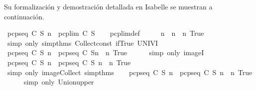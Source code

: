 \begin{isabellebody}
\begin{isamarkuptext}
  Su formalización y demostración detallada en Isabelle se muestran a continuación.%
\end{isamarkuptext}\isamarkuptrue%
\isamarkupfalse%
\ {\isachardoublequoteopen}pcp{\isacharunderscore}seq\ C\ S\ n\ {\isasymsubseteq}\ pcp{\isacharunderscore}lim\ C\ S{\isachardoublequoteclose}\isanewline
%
\isadelimproof
\ \ %
\endisadelimproof
%
\isatagproof
{}\isamarkupfalse%
\ pcp{\isacharunderscore}lim{\isacharunderscore}def\isanewline
{}\isamarkupfalse%
\ {\isacharminus}\isanewline
\ \ \isamarkupfalse%
\ {\isachardoublequoteopen}n\ {\isasymin}\ {\isacharbraceleft}n\ {\isacharbar}\ n{\isachardot}\ True{\isacharbraceright}{\isachardoublequoteclose}\ \isanewline
\ \ \ \ \isamarkupfalse%
\ {\isacharparenleft}simp\ only{\isacharcolon}\ simp{\isacharunderscore}thms{\isacharparenleft}{}{}{\isacharcomma}{}{}{\isacharparenright}\ Collect{\isacharunderscore}const\ if{\isacharunderscore}True\ UNIV{\isacharunderscore}I{\isacharparenright}\ \isanewline
\ \ \isamarkupfalse%
\ \isamarkupfalse%
\ {\isachardoublequoteopen}pcp{\isacharunderscore}seq\ C\ S\ n\ {\isasymin}\ {\isacharparenleft}pcp{\isacharunderscore}seq\ C\ S{\isacharparenright}{\isacharbackquote}{\isacharbraceleft}n\ {\isacharbar}\ n{\isachardot}\ True{\isacharbraceright}{\isachardoublequoteclose}\isanewline
\ \ \ \ \isamarkupfalse%
\ {\isacharparenleft}simp\ only{\isacharcolon}\ imageI{\isacharparenright}\isanewline
\ \ \isamarkupfalse%
\ \isamarkupfalse%
\ {\isachardoublequoteopen}pcp{\isacharunderscore}seq\ C\ S\ n\ {\isasymin}\ {\isacharbraceleft}pcp{\isacharunderscore}seq\ C\ S\ n\ {\isacharbar}\ n{\isachardot}\ True{\isacharbraceright}{\isachardoublequoteclose}\isanewline
\ \ \ \ \isamarkupfalse%
\ {\isacharparenleft}simp\ only{\isacharcolon}\ image{\isacharunderscore}Collect\ simp{\isacharunderscore}thms{\isacharparenleft}{}{}{\isacharparenright}{\isacharparenright}\isanewline
\ \ \isamarkupfalse%
\ {\isachardoublequoteopen}pcp{\isacharunderscore}seq\ C\ S\ n\ {\isasymsubseteq}\ {\isasymUnion}{\isacharbraceleft}pcp{\isacharunderscore}seq\ C\ S\ n\ {\isacharbar}\ n{\isachardot}\ True{\isacharbraceright}{\isachardoublequoteclose}\isanewline
\ \ \ \ \isamarkupfalse%
\ {\isacharparenleft}simp\ only{\isacharcolon}\ Union{\isacharunderscore}upper{\isacharparenright}\isanewline
{}\isamarkupfalse%

\end{isabellebody}
